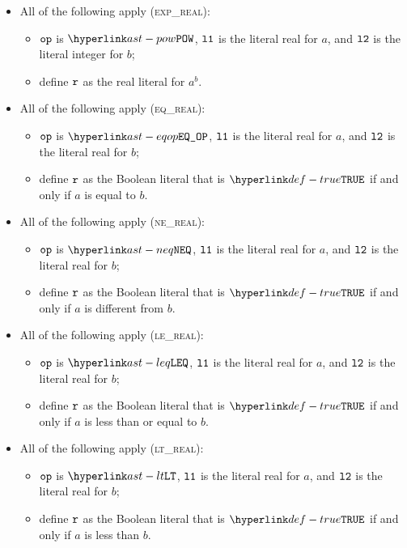 \begin{itemize}
  \item All of the following apply (\textsc{exp\_real}):
  \begin{itemize}
    \item $\texttt{op}$ is $\POW$, $\texttt{l1}$ is the literal real for $a$, and $\texttt{l2}$ is the literal integer for $b$;
    \item define $\texttt{r}$ as the real literal for $a^b$.
  \end{itemize}

  \item All of the following apply (\textsc{eq\_real}):
  \begin{itemize}
    \item $\texttt{op}$ is $\EQOP$, $\texttt{l1}$ is the literal real for $a$, and $\texttt{l2}$ is the literal real for $b$;
    \item define $\texttt{r}$ as the Boolean literal that is $\True$ if and only if $a$ is equal to $b$.
  \end{itemize}

  \item All of the following apply (\textsc{ne\_real}):
  \begin{itemize}
    \item $\texttt{op}$ is $\NEQ$, $\texttt{l1}$ is the literal real for $a$, and $\texttt{l2}$ is the literal real for $b$;
    \item define $\texttt{r}$ as the Boolean literal that is $\True$ if and only if $a$ is different from $b$.
  \end{itemize}

  \item All of the following apply (\textsc{le\_real}):
  \begin{itemize}
    \item $\texttt{op}$ is $\LEQ$, $\texttt{l1}$ is the literal real for $a$, and $\texttt{l2}$ is the literal real for $b$;
    \item define $\texttt{r}$ as the Boolean literal that is $\True$ if and only if $a$ is less than or equal to $b$.
  \end{itemize}

  \item All of the following apply (\textsc{lt\_real}):
  \begin{itemize}
    \item $\texttt{op}$ is $\LT$, $\texttt{l1}$ is the literal real for $a$, and $\texttt{l2}$ is the literal real for $b$;
    \item define $\texttt{r}$ as the Boolean literal that is $\True$ if and only if $a$ is less than $b$.
  \end{itemize}


\end{itemize}
